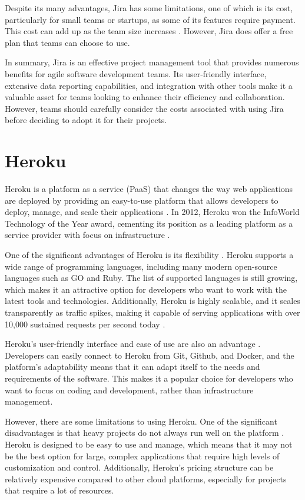 Despite its many advantages, Jira has some limitations, one of which is its cost, particularly for small teams or startups, as some of its features require payment. This cost can add up as the team size increases \cite{ravis}. However, Jira does offer a free plan that teams can choose to use.

In summary, Jira is an effective project management tool that provides numerous benefits for agile software development teams. Its user-friendly interface, extensive data reporting capabilities, and integration with other tools make it a valuable asset for teams looking to enhance their efficiency and collaboration. However, teams should carefully consider the costs associated with using Jira before deciding to adopt it for their projects.

\section{Heroku}
Heroku is a platform as a service (PaaS) that changes the way web applications are deployed by providing an easy-to-use platform that allows developers to deploy, manage, and scale their applications \cite{mike}. In 2012, Heroku won the InfoWorld Technology of the Year award, cementing its position as a leading platform as a service provider with focus on infrastructure \cite{greengard, news}.

One of the significant advantages of Heroku is its flexibility \cite{greengard, anubhav, patrick}. Heroku supports a wide range of programming languages, including many modern open-source languages such as GO and Ruby. The list of supported languages is still growing, which makes it an attractive option for developers who want to work with the latest tools and technologies. Additionally, Heroku is highly scalable, and it scales transparently as traffic spikes, making it capable of serving applications with over 10,000 sustained requests per second today \cite{anubhav}.

Heroku's user-friendly interface and ease of use are also an advantage \cite{greengard}. Developers can easily connect to Heroku from Git, Github, and Docker, and the platform's adaptability means that it can adapt itself to the needs and requirements of the software. This makes it a popular choice for developers who want to focus on coding and development, rather than infrastructure management.

However, there are some limitations to using Heroku. One of the significant disadvantages is that heavy projects do not always run well on the platform \cite{greengard}. Heroku is designed to be easy to use and manage, which means that it may not be the best option for large, complex applications that require high levels of customization and control. Additionally, Heroku's pricing structure can be relatively expensive compared to other cloud platforms, especially for projects that require a lot of resources.

